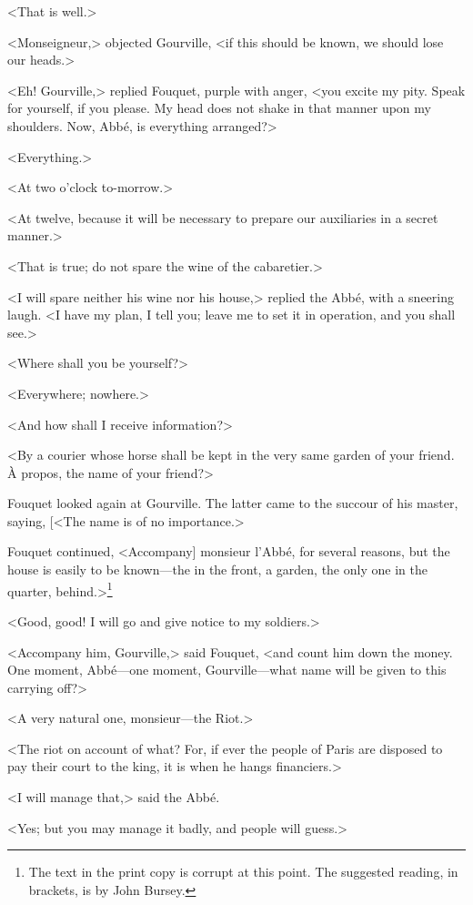 <That is well.>

<Monseigneur,> objected Gourville, <if this should be known, we should lose our heads.>

<Eh! Gourville,> replied Fouquet, purple with anger, <you excite my pity. Speak for yourself, if you please. My head does not shake in that manner upon my shoulders. Now, Abbé, is everything arranged?>

<Everything.>

<At two o'clock to-morrow.>

<At twelve, because it will be necessary to prepare our auxiliaries in a secret manner.>

<That is true; do not spare the wine of the cabaretier.>

<I will spare neither his wine nor his house,> replied the Abbé, with a sneering laugh. <I have my plan, I tell you; leave me to set it in operation, and you shall see.>

<Where shall you be yourself?>

<Everywhere; nowhere.>

<And how shall I receive information?>

<By a courier whose horse shall be kept in the very same garden of your friend. À propos, the name of your friend?>

Fouquet looked again at Gourville. The latter came to the succour of his master, saying, [<The name is of no importance.>

Fouquet continued, <Accompany] monsieur l'Abbé, for several reasons, but the house is easily to be known—the  in the front, a garden, the only one in the quarter, behind.>\footnote{The text in the print copy is corrupt at this point. The suggested reading, in brackets, is by John Bursey.}

<Good, good! I will go and give notice to my soldiers.>

<Accompany him, Gourville,> said Fouquet, <and count him down the money. One moment, Abbé—one moment, Gourville—what name will be given to this carrying off?>

<A very natural one, monsieur—the Riot.>

<The riot on account of what? For, if ever the people of Paris are disposed to pay their court to the king, it is when he hangs financiers.>

<I will manage that,> said the Abbé.

<Yes; but you may manage it badly, and people will guess.>

